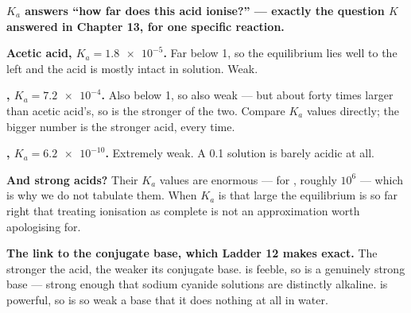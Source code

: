 \documentclass{apchem-worksheet}
\begin{document}
\begin{center}
\end{center}

\begin{workedexample}
\textbf{$K_{a}$ answers ``how far does this acid ionise?'' --- exactly
the question $K$ answered in Chapter 13, for one specific reaction.}

\textbf{Acetic acid, $K_{a} = \num{1.8e-5}$.} Far below 1, so the
equilibrium lies well to the left and the acid is mostly intact in
solution. Weak.

\textbf{, $K_{a} = \num{7.2e-4}$.} Also below 1, so also weak ---
but about forty times larger than acetic acid's, so  is the
stronger of the two. Compare $K_{a}$ values directly; the bigger number
is the stronger acid, every time.

\textbf{, $K_{a} = \num{6.2e-10}$.} Extremely weak. A
\SI{0.1}{\Molar} solution is barely acidic at all.

\textbf{And strong acids?} Their $K_{a}$ values are enormous --- for
, roughly $10^{6}$ --- which is why we do not tabulate them.
When $K_{a}$ is that large the equilibrium is so far right that treating
ionisation as complete is not an approximation worth apologising for.

\textbf{The link to the conjugate base, which Ladder 12 makes exact.}
The stronger the acid, the weaker its conjugate base.  is
feeble, so  is a genuinely strong base --- strong enough that
sodium cyanide solutions are distinctly alkaline.  is powerful,
so  is so weak a base that it does nothing at all in water.
\end{workedexample}
\end{document}
